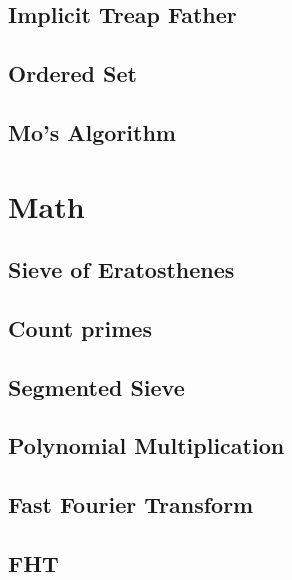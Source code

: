\subsection{Implicit Treap Father}
\raggedbottom
\hrulefill
\subsection{Ordered Set}
\raggedbottom
\hrulefill
\subsection{Mo's Algorithm}
\raggedbottom
\hrulefill

\section{Math}
\subsection{Sieve of Eratosthenes}
\raggedbottom
\hrulefill
\subsection{Count primes}
\raggedbottom
\hrulefill
\subsection{Segmented Sieve}
\raggedbottom
\hrulefill
\subsection{Polynomial Multiplication}
\raggedbottom
\hrulefill
\subsection{Fast Fourier Transform}
\raggedbottom
\hrulefill
\subsection{FHT}
\raggedbottom
\hrulefill
